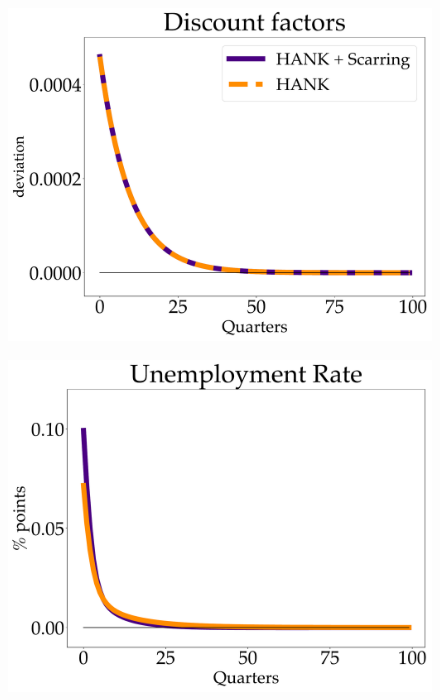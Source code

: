 \begin{figure}[!h]
    \centering %
\begin{minipage}{0.33\textwidth}
  \includegraphics[scale=.14]{text/chapter1/Figures/DiscFac_IPR}
  \label{fig:1}
\end{minipage}\hfil %
\begin{minipage}{0.33\textwidth}
  \includegraphics[scale=.14]{text/chapter1/Figures/U_IPR}
  \label{fig:2}
\end{minipage}\hfil %
\begin{minipage}{0.33\textwidth}

\end{minipage}
\end{figure}
